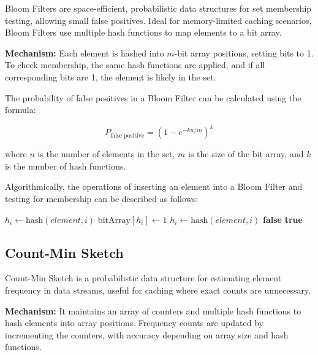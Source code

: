 \documentclass[12pt]{book} %
\begin{document}
Bloom Filters are space-efficient, probabilistic data structures for set membership testing, allowing small false positives. Ideal for memory-limited caching scenarios, Bloom Filters use multiple hash functions to map elements to a bit array.

\textbf{Mechanism:} Each element is hashed into \(m\)-bit array positions, setting bits to 1. To check membership, the same hash functions are applied, and if all corresponding bits are 1, the element is likely in the set.

The probability of false positives in a Bloom Filter can be calculated using the formula:

\[
P_{\text{false positive}} = \left(1 - e^{-kn/m}\right)^k
\]

where \(n\) is the number of elements in the set, \(m\) is the size of the bit array, and \(k\) is the number of hash functions.

Algorithmically, the operations of inserting an element into a Bloom Filter and testing for membership can be described as follows:
\FloatBarrier
\begin{algorithm}[H]
\caption{Bloom Filter Operations}
\begin{algorithmic}[1]
        \State $h_i \gets \text{hash}(element, i)$ 
        \State $\text{bitArray}[h_i] \gets 1$ 
    \EndFor
\EndProcedure
{}
        \State $h_i \gets \text{hash}(element, i)$ 
            \State \Return \textbf{false} 
        \EndIf
    \EndFor
    \State \Return \textbf{true} 
\EndProcedure
\end{algorithmic}
\end{algorithm}
\FloatBarrier

\subsection{Count-Min Sketch}

Count-Min Sketch is a probabilistic data structure for estimating element frequency in data streams, useful for caching where exact counts are unnecessary.

\textbf{Mechanism:} It maintains an array of counters and multiple hash functions to hash elements into array positions. Frequency counts are updated by incrementing the counters, with accuracy depending on array size and hash functions.
\end{document}
